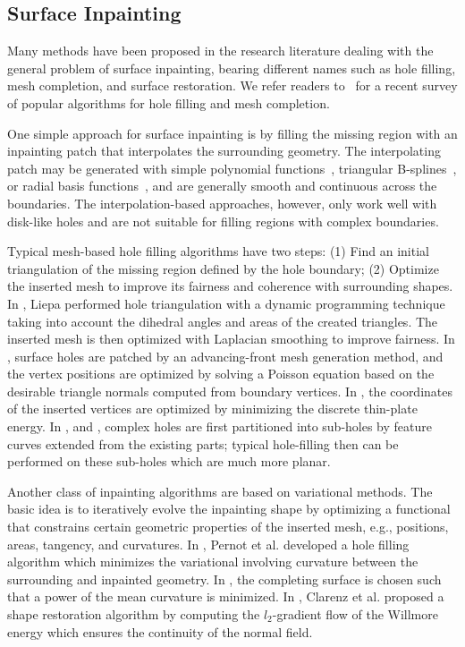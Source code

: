 \subsection{Surface Inpainting}

Many methods have been proposed in the research literature dealing
with the general problem of surface inpainting, bearing different
names such as hole filling, mesh completion, and surface restoration.
We refer readers to~\cite{Attene2013} for a recent survey of popular
algorithms for hole filling and mesh completion.

One simple approach for surface inpainting is by filling the missing region
with an inpainting patch that interpolates the surrounding geometry. The
interpolating patch may be generated with simple polynomial
functions~\cite{Wang2007}, triangular B-splines~\cite{Pfeifle1996}, or radial
basis functions~\cite{Branch2006}, and are generally smooth and continuous
across the boundaries. The interpolation-based approaches, however, only work
well with disk-like holes and are not suitable for filling regions with
complex boundaries.

Typical mesh-based hole filling algorithms have two steps: (1) Find an
initial triangulation of the missing region defined by the hole
boundary; (2) Optimize the inserted mesh to improve its fairness and
coherence with surrounding shapes. In \cite{Liepa2003}, Liepa
performed hole triangulation with a dynamic programming technique
taking into account the dihedral angles and areas of the created
triangles. The inserted mesh is then optimized with Laplacian
smoothing to improve fairness. In \cite{Zhao2007}, surface holes are
patched by an advancing-front mesh generation method, and the vertex
positions are optimized by solving a Poisson equation based on the
desirable triangle normals computed from boundary vertices. In \cite{Bac2008},
the coordinates of the inserted vertices are optimized by minimizing the
discrete thin-plate energy.
In \cite{Li2010}, \cite{Wang2012} and \cite{Ngo2013}, complex holes are
first partitioned into sub-holes by feature curves extended from the
existing parts; typical hole-filling then can be performed on these
sub-holes which are much more planar.

Another class of inpainting algorithms are based on variational
methods. The basic idea is to iteratively evolve the inpainting shape
by optimizing a functional that constrains certain geometric
properties of the inserted mesh, e.g., positions, areas, tangency, and
curvatures. In \cite{Pernot2006}, Pernot et al. developed a hole
filling algorithm which minimizes the variational involving curvature
between the surrounding and inpainted geometry. In
\cite{Caselles2008}, the completing surface is chosen such that a
power of the mean curvature is minimized. In \cite{Clarenz2004},
Clarenz et al. proposed a shape restoration algorithm by computing the
$l_2$-gradient flow of the Willmore energy which ensures the
continuity of the normal field.

